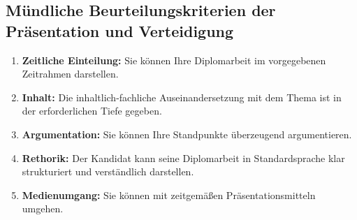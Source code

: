 \documentclass[a4paper, 12pt, xcolor=dvipsnames]{scrartcl}		%
\begin{document}
\subsection{Mündliche Beurteilungskriterien der Präsentation und Verteidigung}
\begin{enumerate}
\item\textbf{Zeitliche Einteilung:} Sie können Ihre Diplomarbeit im vorgegebenen Zeitrahmen darstellen.
\item\textbf{Inhalt:} Die inhaltlich-fachliche Auseinandersetzung mit dem Thema ist in der erforderlichen Tiefe gegeben.
\item\textbf{Argumentation:} Sie können Ihre Standpunkte überzeugend argumentieren.
\item\textbf{Rethorik:} Der Kandidat kann seine Diplomarbeit in Standardsprache klar strukturiert und verständlich darstellen.
\item\textbf{Medienumgang:} Sie können mit zeitgemäßen Präsentationsmitteln umgehen.
\end{enumerate}

\pagebreak

%
%
%
%
\end{document}
